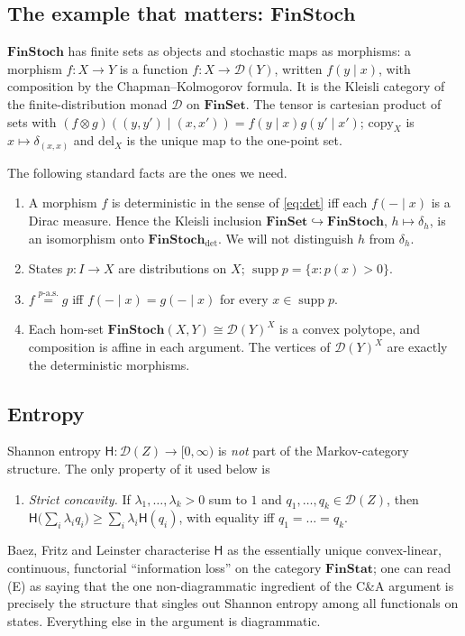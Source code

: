 \documentclass[11pt,a4paper]{article}
\theoremstyle{definition}
\theoremstyle{remark}
\newcommand{\FinSet}{\mathbf{FinSet}}
\newcommand{\FinStoch}{\mathbf{FinStoch}}
\newcommand{\Dist}{\mathcal{D}}
\newcommand{\copym}[1]{\mathrm{copy}_{#1}}
\newcommand{\delm}[1]{\mathrm{del}_{#1}}
\newcommand{\supp}{\operatorname{supp}}
\newcommand{\aseq}[1]{\overset{#1\text{-a.s.}}{=}}
\newcommand{\ent}{\mathsf{H}}
\begin{document}
\subsection{The example that matters: $\FinStoch$}

$\FinStoch$ has finite sets as objects and stochastic maps as morphisms: a
morphism $f\colon X\to Y$ is a function $f\colon X\to\Dist(Y)$, written
$f(y\mid x)$, with composition by the Chapman--Kolmogorov formula. It is the
Kleisli category of the finite-distribution monad $\Dist$ on $\FinSet$.
The tensor is cartesian product of sets with $(f\otimes g)((y,y')\mid(x,x'))=f(y\mid x)g(y'\mid x')$; $\copym{X}$ is $x\mapsto\delta_{(x,x)}$ and $\delm{X}$ is the unique map to the one-point set.

The following standard facts are the ones we need.
\begin{enumerate}[label=(F\arabic*)]
\item A morphism $f$ is deterministic in the sense of \eqref{eq:det} iff each
$f(-\mid x)$ is a Dirac measure. Hence the Kleisli inclusion
$\FinSet\hookrightarrow\FinStoch$, $h\mapsto\delta_h$, is an isomorphism onto
$\FinStoch_{\mathrm{det}}$. We will not distinguish $h$ from $\delta_h$.
\item States $p\colon I\to X$ are distributions on $X$; $\supp p=\{x: p(x)>0\}$.
\item $f\aseq{p}g$ iff $f(-\mid x)=g(-\mid x)$ for every $x\in\supp p$.
\item Each hom-set $\FinStoch(X,Y)\cong\Dist(Y)^X$ is a convex polytope, and
composition is affine in each argument. The vertices of $\Dist(Y)^X$ are exactly
the deterministic morphisms.
\end{enumerate}

\subsection{Entropy}

Shannon entropy $\ent\colon\Dist(Z)\to[0,\infty)$ is \emph{not} part of the
Markov-category structure. The only property of it used below is
\begin{enumerate}[label=(E)]
\item \emph{Strict concavity.} If $\lambda_1,\dots,\lambda_k>0$ sum to $1$ and
$q_1,\dots,q_k\in\Dist(Z)$, then $\ent\big(\sum_i\lambda_i q_i\big)\ge\sum_i\lambda_i\ent(q_i)$, with equality iff $q_1=\dots=q_k$.
\end{enumerate}
Baez, Fritz and Leinster \cite{BFL2011} characterise $\ent$ as the essentially
unique convex-linear, continuous, functorial ``information loss'' on the
category $\mathbf{FinStat}$; one can read (E) as saying that the one
non-diagrammatic ingredient of the C\&A argument is precisely the structure that
singles out Shannon entropy among all functionals on states. Everything else in
the argument is diagrammatic.
\end{document}

